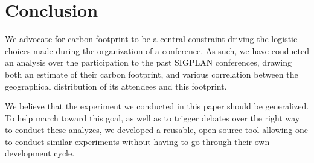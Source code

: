 \section{Conclusion}

We advocate for carbon footprint to be a central constraint driving the logistic
choices made during the organization of a conference. As such, we have conducted an
analysis over the participation to the past SIGPLAN conferences, drawing both an
estimate of their carbon footprint, and various correlation between the
geographical distribution of its attendees and this footprint.


We believe that the experiment we conducted in this paper should be generalized.
To help march toward this goal, as well as to trigger debates over the right way
to conduct these analyzes, we developed a reusable, open source tool allowing
one to conduct similar experiments without having to go through their own
development cycle.
